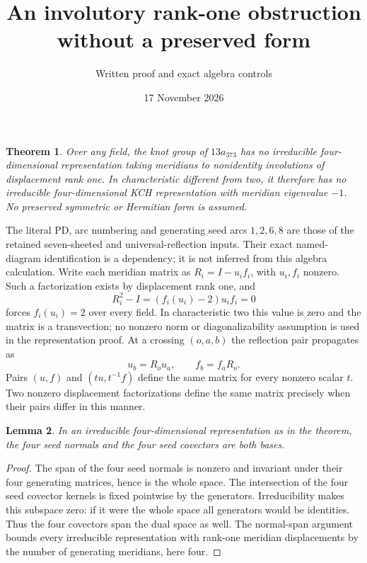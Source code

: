 \documentclass[11pt]{article}
\title{An involutory rank-one obstruction without a preserved form}
\author{Written proof and exact algebra controls}
\date{17 November 2026}
\newtheorem{lemma}{Lemma}
\newtheorem{theorem}[lemma]{Theorem}
\begin{document}
\maketitle

\begin{theorem}\label{thm:373}
Over any field, the knot group of
$13a_{373}$ has no irreducible four-dimensional representation taking
meridians to nonidentity involutions of displacement rank one.
In characteristic different from two, it therefore has no irreducible
four-dimensional KCH representation with meridian eigenvalue $-1$.
No preserved symmetric or Hermitian form is assumed.
\end{theorem}

The literal PD, arc numbering and generating seed arcs $1,2,6,8$
are those of the retained seven-sheeted and universal-reflection
inputs. Their exact named-diagram identification is a dependency;
it is not inferred from this algebra calculation.
Write each meridian matrix as $R_i=I-u_if_i$, with $u_i,f_i$ nonzero.
Such a factorization exists by displacement rank one, and
\[
 R_i^2-I=(f_i(u_i)-2)u_if_i=0
\]
forces $f_i(u_i)=2$ over every field. In characteristic two this
value is zero and the matrix is a transvection; no nonzero norm or
diagonalizability assumption is used in the representation proof.
At a crossing $(o,a,b)$ the reflection pair propagates as
\[
 u_b=R_ou_a,\qquad f_b=f_aR_o.
\]
Pairs $(u,f)$ and $(tu,t^{-1}f)$ define the same matrix for every
nonzero scalar $t$. Two nonzero displacement factorizations define
the same matrix precisely when their pairs differ in this manner.

\begin{lemma}\label{lem:independent}
In an irreducible four-dimensional representation as in the theorem,
the four seed normals and the four seed covectors are both bases.
\end{lemma}
\begin{proof}
The span of the four seed normals is nonzero and invariant under
their four generating matrices, hence is the whole space. The
intersection of the four seed covector kernels is fixed pointwise
by the generators. Irreducibility makes this subspace zero: if it
were the whole space all generators would be identities. Thus the
four covectors span the dual space as well.
The normal-span argument bounds every irreducible representation
with rank-one meridian displacements by the number of generating
meridians, here four.
\end{proof}
\end{document}
